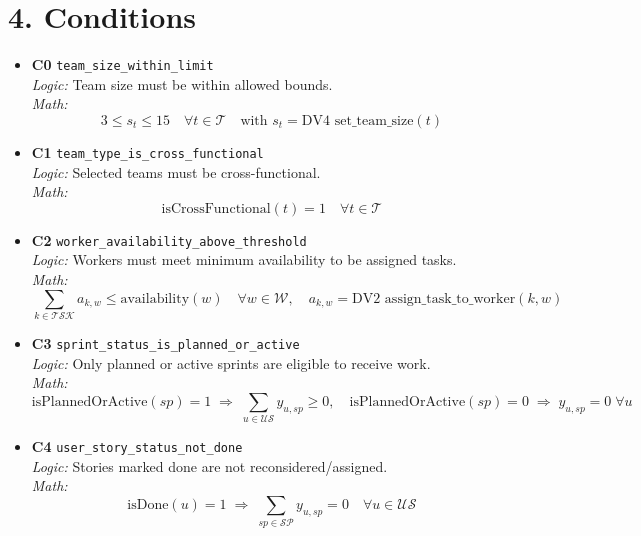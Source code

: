 \documentclass[11pt,a4paper]{article}
\begin{document}
\section{4. Conditions}
\begin{itemize}[leftmargin=2em]

  \item \textbf{C0} \texttt{team\_size\_within\_limit} \\
  \emph{Logic:} Team size must be within allowed bounds. \\
  \emph{Math:}
  \[
    3 \le s_t \le 15 \quad\forall t\in\mathcal{T}
    \quad\text{with } s_t=\text{DV4 } \mathrm{set\_team\_size}(t)
  \]

  \item \textbf{C1} \texttt{team\_type\_is\_cross\_functional} \\
  \emph{Logic:} Selected teams must be cross-functional. \\
  \emph{Math:}
  \[
    \mathrm{isCrossFunctional}(t)=1 \quad\forall t\in\mathcal{T}
  \]

  \item \textbf{C2} \texttt{worker\_availability\_above\_threshold} \\
  \emph{Logic:} Workers must meet minimum availability to be assigned tasks. \\
  \emph{Math:}
  \[
    \sum_{k\in\mathcal{TSK}} a_{k,w} \le \mathrm{availability}(w) \quad \forall w\in\mathcal{W},
    \quad a_{k,w}=\text{DV2 } \mathrm{assign\_task\_to\_worker}(k,w)
  \]

  \item \textbf{C3} \texttt{sprint\_status\_is\_planned\_or\_active} \\
  \emph{Logic:} Only planned or active sprints are eligible to receive work. \\
  \emph{Math:}
  \[
    \mathrm{isPlannedOrActive}(sp)=1 \;\Rightarrow\; \sum_{u\in\mathcal{US}} y_{u,sp} \ge 0, \quad
    \mathrm{isPlannedOrActive}(sp)=0 \;\Rightarrow\; y_{u,sp}=0 \;\forall u
  \]

  \item \textbf{C4} \texttt{user\_story\_status\_not\_done} \\
  \emph{Logic:} Stories marked done are not reconsidered/assigned. \\
  \emph{Math:}
  \[
    \mathrm{isDone}(u)=1 \;\Rightarrow\; \sum_{sp\in\mathcal{SP}} y_{u,sp}=0 \quad\forall u\in\mathcal{US}
  \]


\end{itemize}
\end{document}
